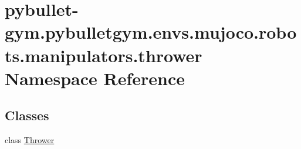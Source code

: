\hypertarget{namespacepybullet-gym_1_1pybulletgym_1_1envs_1_1mujoco_1_1robots_1_1manipulators_1_1thrower}{}\section{pybullet-\/gym.pybulletgym.\+envs.\+mujoco.\+robots.\+manipulators.\+thrower Namespace Reference}
\label{namespacepybullet-gym_1_1pybulletgym_1_1envs_1_1mujoco_1_1robots_1_1manipulators_1_1thrower}
\subsection*{Classes}
\begin{DoxyCompactItemize}
\item 
class \hyperlink{classpybullet-gym_1_1pybulletgym_1_1envs_1_1mujoco_1_1robots_1_1manipulators_1_1thrower_1_1_thrower}{Thrower}
\end{DoxyCompactItemize}
